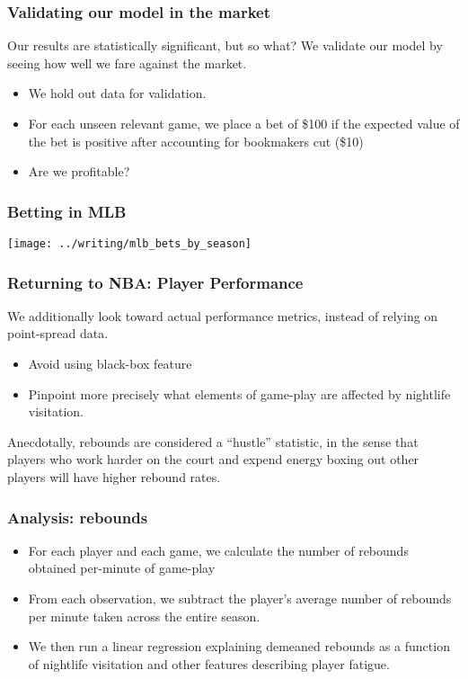 \documentclass{beamer}
\begin{document}
\begin{frame}   \frametitle{Validating our model in the market}
  Our results are statistically significant, but so what? We validate our model by seeing
  how well we fare against the market.

  \begin{itemize}     \item We hold out data for validation.
    \item For each unseen relevant game, we place a bet of \$100 if the expected value of the bet
      is positive after accounting for bookmakers cut (\$10)
    \item Are we profitable?
  \end{itemize} \end{frame}

\begin{frame}   \frametitle{Betting in MLB}
  \centering
  \texttt{[image: ../writing/mlb\_bets\_by\_season]} \end{frame}

\begin{frame}   \frametitle{Returning to NBA: Player Performance}
  We additionally look toward actual performance metrics, instead of relying on point-spread data.
  
  \begin{itemize}     \item Avoid using black-box feature
    \item Pinpoint more precisely what elements of game-play are affected by nightlife visitation.   \end{itemize}

  Anecdotally, rebounds are considered a ``hustle'' statistic, in the sense that players
  who work harder on the court and expend energy boxing out other players will have higher
  rebound rates. \end{frame}

\begin{frame}   \frametitle{Analysis: rebounds}
  \begin{itemize}     \item For each player and each game, we calculate the number of rebounds obtained per-minute of game-play
    \item From each observation, we subtract the player's average number of rebounds per minute taken across the entire season.
    \item We then run a linear regression explaining demeaned rebounds as a function of 
      nightlife visitation and other features describing player fatigue.   \end{itemize} \end{frame}
\end{document}
